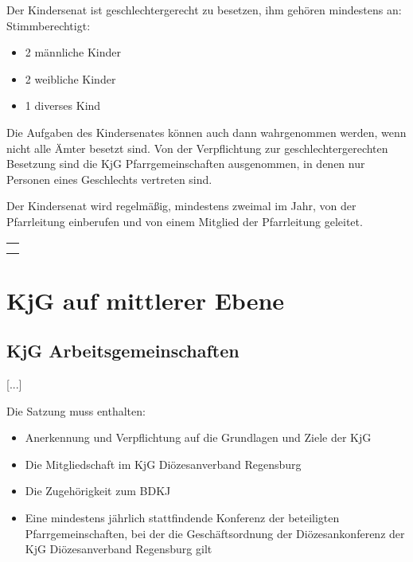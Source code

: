 \documentclass[12pt]{report}
\begin{document}
\begin{flushleft}
Der Kindersenat ist {\color{red}geschlechtergerecht} zu besetzen, ihm gehören mindestens an:
Stimmberechtigt:
{\color{red}
\begin{itemize}
  \item 2 männliche Kinder
  \item 2 weibliche Kinder
  \item 1 diverses Kind
\end{itemize}
} %
Die Aufgaben des Kindersenates können auch dann wahrgenommen werden, wenn nicht alle Ämter besetzt sind.
{\color{red}Von der Verpflichtung zur geschlechtergerechten Besetzung sind die KjG Pfarrgemeinschaften ausgenommen,
in denen nur Personen eines Geschlechts vertreten sind.}

Der Kindersenat wird regelmäßig, mindestens zweimal im Jahr, von der Pfarrleitung einberufen
und von einem Mitglied der Pfarrleitung geleitet.


\begin{table}[H]
 \begin{tabular}{|l|}
  \hline
  \rowcolor[HTML]{9AFF99} 
  \rule[-1ex]{0pt}{4ex}
  \begin{minipage}[t]{\textwidth}
   \textbf{Ende\\}  
    \end{minipage}
  \\ \hline
 \end{tabular}
\end{table}
\chapter{KjG auf mittlerer Ebene}

\section{KjG Arbeitsgemeinschaften}
[...]

Die Satzung muss enthalten:
\begin{itemize}
  \item Anerkennung und Verpflichtung auf die Grundlagen und Ziele der KjG
  \item Die Mitgliedschaft im KjG Diözesanverband Regensburg
  \item Die Zugehörigkeit zum BDKJ
  \item Eine mindestens jährlich stattfindende Konferenz der beteiligten Pfarrgemeinschaften, bei der
        die Geschäftsordnung der Diözesankonferenz der KjG Diözesanverband Regensburg gilt
\end{itemize}


\end{flushleft}
\end{document}
